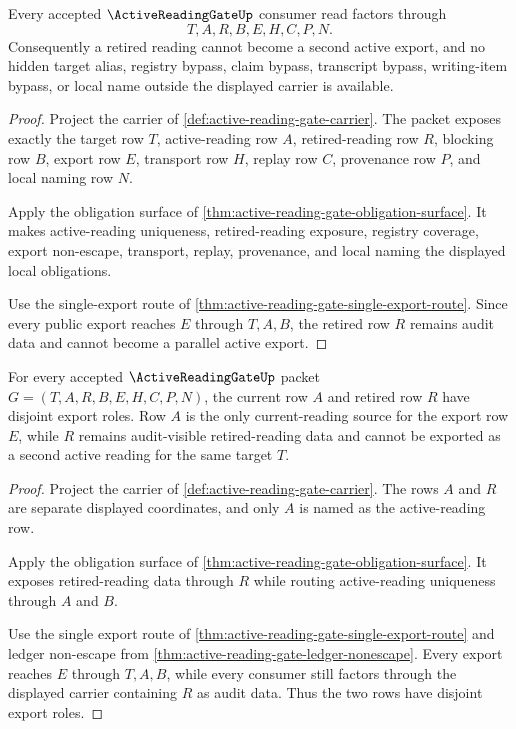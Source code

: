 \begin{theorem}
\label{thm:active-reading-gate-ledger-nonescape}
Every accepted $\ActiveReadingGateUp$ consumer read factors through
$$
T,A,R,B,E,H,C,P,N.
$$
Consequently a retired reading cannot become a second active export, and no hidden target alias, registry bypass, claim bypass, transcript bypass, writing-item bypass, or local name outside the displayed carrier is available.
\end{theorem}
\begin{proof}
Project the carrier of \autoref{def:active-reading-gate-carrier}. The packet exposes exactly the target row $T$, active-reading row $A$, retired-reading row $R$, blocking row $B$, export row $E$, transport row $H$, replay row $C$, provenance row $P$, and local naming row $N$.

Apply the obligation surface of \autoref{thm:active-reading-gate-obligation-surface}. It makes active-reading uniqueness, retired-reading exposure, registry coverage, export non-escape, transport, replay, provenance, and local naming the displayed local obligations.

Use the single-export route of \autoref{thm:active-reading-gate-single-export-route}. Since every public export reaches $E$ through $T,A,B$, the retired row $R$ remains audit data and cannot become a parallel active export.
\end{proof}

\begin{theorem}
\label{thm:active-reading-gate-current-retired-disjointness}
For every accepted $\ActiveReadingGateUp$ packet $G=(T,A,R,B,E,H,C,P,N)$, the current row $A$ and retired row $R$ have disjoint export roles. Row $A$ is the only current-reading source for the export row $E$, while $R$ remains audit-visible retired-reading data and cannot be exported as a second active reading for the same target $T$.
\end{theorem}
\begin{proof}
Project the carrier of \autoref{def:active-reading-gate-carrier}. The rows $A$ and $R$ are separate displayed coordinates, and only $A$ is named as the active-reading row.

Apply the obligation surface of \autoref{thm:active-reading-gate-obligation-surface}. It exposes retired-reading data through $R$ while routing active-reading uniqueness through $A$ and $B$.

Use the single export route of \autoref{thm:active-reading-gate-single-export-route} and ledger non-escape from \autoref{thm:active-reading-gate-ledger-nonescape}. Every export reaches $E$ through $T,A,B$, while every consumer still factors through the displayed carrier containing $R$ as audit data. Thus the two rows have disjoint export roles.
\end{proof}

